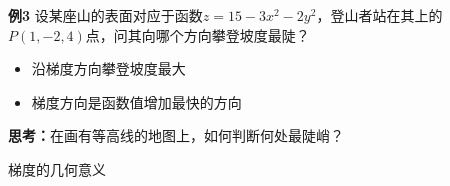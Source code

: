 \begin{frame}
	\linespread{1.2}
	\begin{exampleblock}{{\bf 例3}\hfill}
		设某座山的表面对应于函数$z=15-3x^2-2y^2$，登山者站在其上的
		$P(1,-2,4)$点，问其向哪个方向攀登坡度最陡？
	\end{exampleblock}\pause 
	\begin{itemize}
	  \item 沿梯度方向攀登坡度最大\pause 
	  \item \alert{梯度方向是函数值增加最快的方向}\pause 
	\end{itemize}
	{\bf 思考：}在画有等高线的地图上，如何判断何处最陡峭？
\end{frame}

\begin{frame}{梯度的几何意义}
	\linespread{1.2}\pause 
	\begin{center}
	\end{center}
	\vspace{-1em}\pause 
	\begin{columns}
			\begin{center}
				

\end{center}
\end{columns}
\end{frame}
